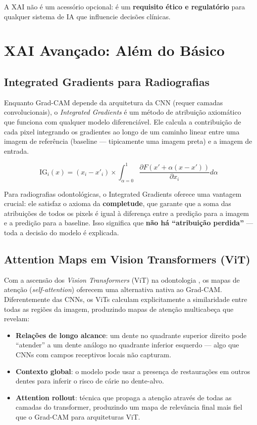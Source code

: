 A XAI não é um acessório opcional: é um \textbf{requisito ético e
regulatório} para qualquer sistema de IA que influencie decisões
clínicas.

\section{XAI Avançado: Além do Básico}

\subsection{Integrated Gradients para Radiografias}

Enquanto Grad-CAM depende da arquitetura da CNN (requer camadas
convolucionais), o \textit{Integrated Gradients} \cite{sundararajan2017axiomatic}
é um método de atribuição axiomático que funciona com qualquer modelo
diferenciável. Ele calcula a contribuição de cada pixel integrando os
gradientes ao longo de um caminho linear entre uma imagem de referência
(baseline — tipicamente uma imagem preta) e a imagem de entrada.

\begin{equation}
  \text{IG}_{i}(x) = (x_{i} - x'_{i}) \times \int_{\alpha=0}^{1}
  \frac{\partial F(x' + \alpha(x - x'))}{\partial x_{i}} d\alpha
  \label{eq:integrated-gradients}
\end{equation}

Para radiografias odontológicas, o Integrated Gradients oferece uma
vantagem crucial: ele satisfaz o axioma da \textbf{completude}, que
garante que a soma das atribuições de todos os pixels é igual à
diferença entre a predição para a imagem e a predição para a baseline.
Isso significa que \textbf{não há ``atribuição perdida''} — toda a
decisão do modelo é explicada.

\subsection{Attention Maps em Vision Transformers (ViT)}

Com a ascensão dos \textit{Vision Transformers} (ViT) na odontologia
\cite{vaswani2017transformer}, os mapas de atenção (\textit{self-attention})
oferecem uma alternativa nativa ao Grad-CAM. Diferentemente das CNNs,
os ViTs calculam explicitamente a similaridade entre todas as regiões
da imagem, produzindo mapas de atenção multicabeça que revelam:

\begin{itemize}
  \item \textbf{Relações de longo alcance}: um dente no quadrante superior
    direito pode ``atender'' a um dente análogo no quadrante inferior
    esquerdo — algo que CNNs com campos receptivos locais não capturam.
  \item \textbf{Contexto global}: o modelo pode usar a presença de
    restaurações em outros dentes para inferir o risco de cárie no
    dente-alvo.
  \item \textbf{Attention rollout}: técnica que propaga a atenção através
    de todas as camadas do transformer, produzindo um mapa de relevância
    final mais fiel que o Grad-CAM para arquiteturas ViT.
\end{itemize}

